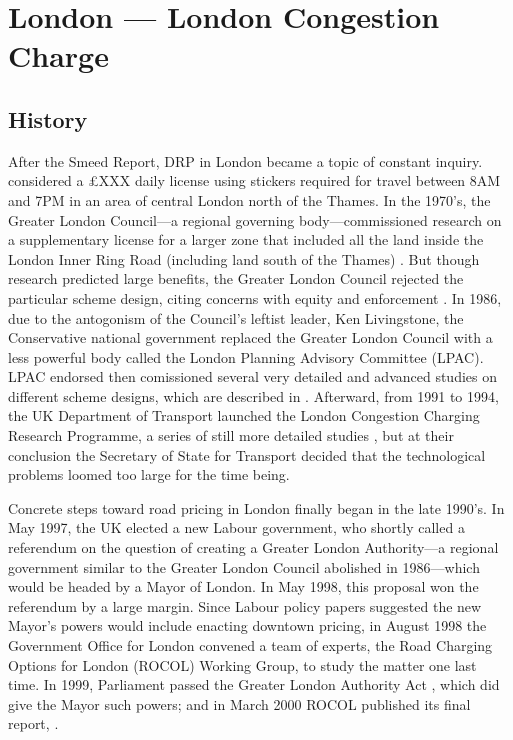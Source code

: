 \section{London --- London Congestion Charge}

\subsection{History}

After the Smeed Report, DRP in London became a topic of constant inquiry. \citet{Thomson1967a} considered a \pounds XXX daily license using stickers required for travel between 8AM and 7PM in an area of central London north of the Thames. In the 1970's, the Greater London Council---a regional governing body---commissioned research on a supplementary license for a larger zone that included all the land inside the London Inner Ring Road (including land south of the Thames) \citep{may1975}. But though research predicted large benefits, the Greater London Council rejected the particular scheme design, citing concerns with equity and enforcement \citep{Richards2006}. In 1986, due to the antogonism of the Council's leftist leader, Ken Livingstone, the Conservative national government replaced the Greater London Council with a less powerful body called the London Planning Advisory Committee (LPAC). LPAC endorsed then comissioned several very detailed and advanced studies on different scheme designs, which are described in \citet[p. 51-54]{Gomez-Ibanez1994}. Afterward, from 1991 to 1994, the UK Department of Transport launched the London Congestion Charging Research Programme, a series of still more detailed studies \citep{MVA1995,Richards1996}, but at their conclusion the Secretary of State for Transport decided that the technological problems loomed too large for the time being.

Concrete steps toward road pricing in London finally began in the late 1990's. In May 1997, the UK elected a new Labour government, who shortly called a referendum on the question of creating a Greater London Authority---a regional government similar to the Greater London Council abolished in 1986---which would be headed by a Mayor of London. In May 1998, this proposal won the referendum by a large margin. Since Labour policy papers suggested the new Mayor's powers would include enacting downtown pricing, in August 1998 the Government Office for London convened a team of experts, the Road Charging Options for London (ROCOL) Working Group, to study the matter one last time. In 1999, Parliament passed the Greater London Authority Act \citep{Parliament1999}, which did give the Mayor such powers; and in March 2000 ROCOL published its final report, \citep{ROCOL2000}.

